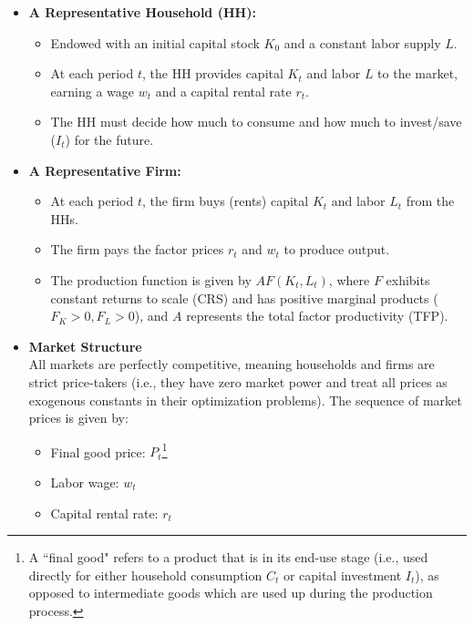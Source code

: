 \begin{itemize}
    \item \textbf{A Representative Household (HH):}
    \begin{itemize}
        \item Endowed with an initial capital stock $K_0$ and a constant labor supply $L$.
        \item At each period $t$, the HH provides capital $K_t$ and labor $L$ to the market, earning a wage $w_t$ and a capital rental rate $r_t$.
        \item The HH must decide how much to consume and how much to invest/save ($I_t$) for the future.
    \end{itemize}
    \item \textbf{A Representative Firm:}
    \begin{itemize}
        \item At each period $t$, the firm buys (rents) capital $K_t$ and labor $L_t$ from the HHs.
        \item The firm pays the factor prices $r_t$ and $w_t$ to produce output.
        \item The production function is given by $AF(K_t, L_t)$, where $F$ exhibits constant returns to scale (CRS) and has positive marginal products ($F_K > 0, F_L > 0$), and $A$ represents the total factor productivity (TFP).
    \end{itemize}
    \item \textbf{Market Structure}\\
    All markets are perfectly competitive, meaning households and firms are strict price-takers (i.e., they have zero market power and treat all prices as exogenous constants in their optimization problems). The sequence of market prices is given by:
\begin{itemize}
    \item Final good price: $P_t$\footnote{A ``final good" refers to a product that is in its end-use stage (i.e., used directly for either household consumption $C_t$ or capital investment $I_t$), as opposed to intermediate goods which are used up during the production process.}
    \item Labor wage: $w_t$
    \item Capital rental rate: $r_t$
\end{itemize}
\end{itemize}


